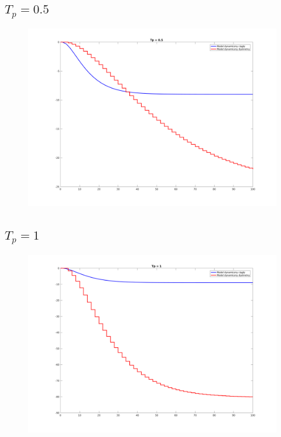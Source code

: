 \documentclass[a4paper, 11pt]{article}
\begin{document}
\subsection{$T_p = 0.5$}
\begin{figure}[H]
\centering
\includegraphics[scale=0.45]{tp_05.png}
\end{figure}

\subsection{$T_p = 1$}
\begin{figure}[H]
\centering
\includegraphics[scale=0.45]{tp_1.png}
\end{figure}
\end{document}
